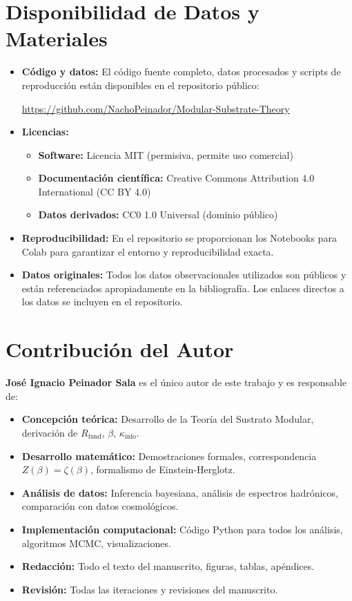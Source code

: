 \documentclass[11pt, a4paper]{article}
\theoremstyle{plain}
\theoremstyle{definition}
\newcommand{\Rfactor}{R_{\text{fund}}}
\newcommand{\Kinfo}{\kappa_{\text{info}}}
\begin{document}
\section*{Disponibilidad de Datos y Materiales}

\begin{itemize}
    \item \textbf{Código y datos:} El código fuente completo, datos procesados y scripts de reproducción están disponibles en el repositorio público:
    \begin{center}
    \url{https://github.com/NachoPeinador/Modular-Substrate-Theory}
    \end{center}
    
    \item \textbf{Licencias:}
    \begin{itemize}
        \item \textbf{Software:} Licencia MIT (permisiva, permite uso comercial)
        \item \textbf{Documentación científica:} Creative Commons Attribution 4.0 International (CC BY 4.0)
        \item \textbf{Datos derivados:} CC0 1.0 Universal (dominio público)
    \end{itemize}
    
    \item \textbf{Reproducibilidad:} En el repositorio se proporcionan los Notebooks para Colab para garantizar el entorno y reproducibilidad exacta. 
    
    \item \textbf{Datos originales:} Todos los datos observacionales utilizados son públicos y están referenciados apropiadamente en la bibliografía. Los enlaces directos a los datos se incluyen en el repositorio.
\end{itemize}

\section*{Contribución del Autor}

\textbf{José Ignacio Peinador Sala} es el único autor de este trabajo y es responsable de:

\begin{itemize}
    \item \textbf{Concepción teórica:} Desarrollo de la Teoría del Sustrato Modular, derivación de $\Rfactor$, $\beta$, $\Kinfo$.
    \item \textbf{Desarrollo matemático:} Demostraciones formales, correspondencia $Z(\beta)=\zeta(\beta)$, formalismo de Einstein-Herglotz.
    \item \textbf{Análisis de datos:} Inferencia bayesiana, análisis de espectros hadrónicos, comparación con datos cosmológicos.
    \item \textbf{Implementación computacional:} Código Python para todos los análisis, algoritmos MCMC, visualizaciones.
    \item \textbf{Redacción:} Todo el texto del manuscrito, figuras, tablas, apéndices.
    \item \textbf{Revisión:} Todas las iteraciones y revisiones del manuscrito.
\end{itemize}
\end{document}
